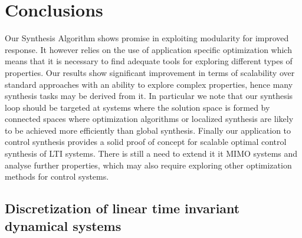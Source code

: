 \documentclass[sigconf]{llncs}
\begin{document}
\section{Conclusions}
\label{sec:conclusions}

Our Synthesis Algorithm shows promise in exploiting modularity for
improved response. It however relies on the use of application
specific optimization which means that it is necessary to find adequate tools for
exploring different types of properties.  Our results show significant
improvement in terms of scalability over standard approaches with an ability to
explore complex properties, hence many synthesis tasks may be derived
from it. In particular we note that our synthesis loop should be targeted at
systems where the solution space is formed by connected spaces where
optimization algorithms or localized synthesis are likely to be achieved more
efficiently than global synthesis.
Finally our application to control synthesis provides a solid proof
of concept for scalable optimal control synthesis of LTI systems. There is still
a need to extend it it MIMO systems and analyse further properties, which may
also require exploring other optimization methods for control systems.

\newpage


\newpage
\appendix

\subsection{Discretization of linear time invariant dynamical systems}\label{sec:continuous_LTI}
\end{document}

